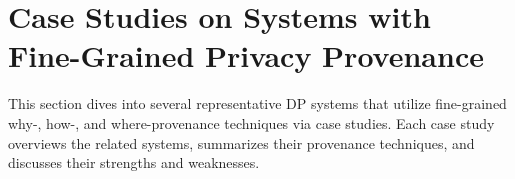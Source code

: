 \section{Case Studies on Systems with Fine-Grained Privacy Provenance}

This section dives into several representative DP systems that utilize fine-grained why-, how-, and where-provenance techniques via case studies. Each case study overviews the related systems, summarizes their provenance techniques, and discusses their strengths and weaknesses.








